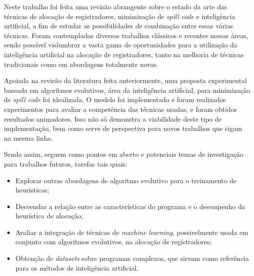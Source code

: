 \documentclass[
	12pt,				%
	openright,			%
	twoside,			%
	a4paper,			%
	tcc,			%
	]{ABNT-DC-UEL}
\begin{document}
Neste trabalho foi feita uma revisão abrangente sobre o estado da arte das técnicas de alocação de registradores, minimização de \textit{spill code} e inteligência artificial, a fim de estudar as possibilidades de combinação entre essas várias técnicas. Foram contemplados diversos trabalhos clássicos e recentes nessas áreas, sendo possível vislumbrar a vasta gama de oportunidades para a utilização da inteligência artificial na alocação de registradores, tanto na melhoria de técnicas tradicionais como em abordagens totalmente novas.

Apoiada na revisão da literatura feita anteriormente, uma proposta experimental baseada em algoritmos evolutivos, área da inteligência artificial, para minimização de \textit{spill code} foi idealizada. O modelo foi implementado e foram realizados experimentos para avaliar a competência das técnicas usadas, e foram obtidos resultados animadores. Isso não só demonstra a viabilidade deste tipo de implementação, bem como serve de perspectiva para novos trabalhos que sigam na mesma linha.

Sendo assim, seguem como pontos em aberto e potenciais temas de investigação para trabalhos futuros, tarefas tais quais:

\begin{itemize}
    \item Explorar outras abordagens de algoritmo evolutivo para o treinamento de heurísticas;
    \item Desvendar a relação entre as características do programa e o desempenho da heurística de alocação;
    \item Avaliar a integração de técnicas de \textit{machine learning}, possivelmente usada em conjunto com algoritmos evolutivos, na alocação de registradores;
    \item Obtenção de \textit{datasets} sobre programas complexos, que sirvam como referência para os métodos de inteligência artificial.
\end{itemize}


\end{document}
